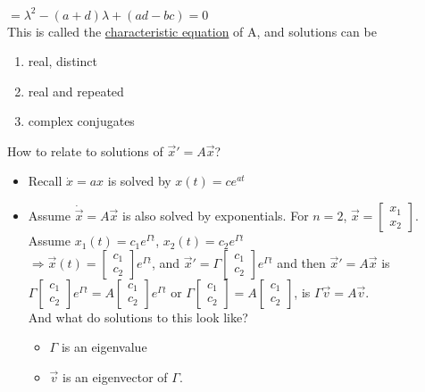 \begin{enumerate}[label=\protect\circled{\Roman*}]
		$ = \lambda^2 - (a + d)\lambda + (ad - bc) = 0$\\
		This is called the \underline{characteristic equation} of A, and solutions can be
		\begin{enumerate}[label=\protect\circled{\arabic*}]
		\item real, distinct
		\item real and repeated
		\item complex conjugates
		\end{enumerate}
		How to relate to solutions of $\vec{x}' = A\vec{x}$?
		\begin{itemize}
			\item Recall $\dot{x} = ax$ is solved by $x(t) = ce^{at}$
			\item Assume $\dot{\vec{x}} = A\vec{x}$ is also solved by exponentials. For $n=2$, $\vec{x} = \begin{bmatrix}
				x_1 \\x_2
			\end{bmatrix}$. Assume $x_1(t) = c_1e^{\Gamma t}$, $x_2(t) = c_2e^{\Gamma t}$\\
			$\Rightarrow \vec{x}(t) = \begin{bmatrix}
				c_1\\c_2
			\end{bmatrix} e^{\Gamma t}$, and $\vec{x}' = \Gamma \begin{bmatrix}
				c_1\\c_2
			\end{bmatrix} e^{\Gamma t}$ and then $\vec{x}' = A \vec{x}$ is $\Gamma \begin{bmatrix}
				c_1\\c_2
			\end{bmatrix} e^{\Gamma t} = A \begin{bmatrix}
				c_1\\c_2
			\end{bmatrix} e^{\Gamma t}$ or $\Gamma \begin{bmatrix}
				c_1\\c_2
			\end{bmatrix}  = A \begin{bmatrix}
				c_1\\c_2
			\end{bmatrix}$, is $\Gamma \vec{v} = A\vec{v}$.\\
			And what do solutions to this look like? 
			\begin{itemize}
			\item $\Gamma$ is an eigenvalue
			\item $\vec{v}$ is an eigenvector of $\Gamma$.

\end{itemize}
\end{itemize}
\end{enumerate}
